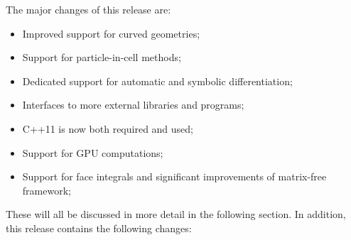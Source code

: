 \documentclass{ansarticle-preprint}
\begin{document}
The major changes of this release are:
\begin{itemize}
\item Improved support for curved geometries;
\item Support for particle-in-cell methods;
\item Dedicated support for automatic and symbolic differentiation;
\item Interfaces to more external libraries and programs;
\item C++11 is now both required and used;
\item Support for GPU computations;
\item Support for face integrals and significant improvements of matrix-free framework;
\end{itemize}
These will all be discussed in more detail in the
following section. In addition, this release contains the following changes:
\end{document}
